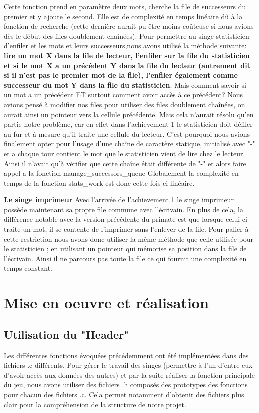 \documentclass[12pt]{article}
\begin{document}
\bigbreak
Cette fonction prend en paramètre deux mots, cherche la file de successeurs du premier et y ajoute le second. Elle est de complexité en temps linéaire dû à la fonction de recherche (cette dernière aurait pu être moins coûteuse si nous avions dès le début des files doublement chaînées). Pour permettre au singe statisticien d'enfiler et les mots et leurs successeurs,nous avons utilisé la méthode suivante: \textbf{lire un mot  X dans la file de lecteur, l'enfiler sur la file du statisticien et si le mot X a un précédent Y dans la file du lecteur (autrement dit si il n'est pas le premier mot de la file), l'enfiler également comme successeur du mot Y dans la file du statisticien}. Mais comment savoir si un mot a un précédent ET surtout comment avoir accès à ce précédent? Nous avions pensé à modifier nos files pour utiliser des files doublement chaînées, on aurait ainsi un pointeur vers la cellule précédente. Mais cela n'aurait résolu qu'en partie notre problème, car en effet dans l'achievement 1 le statisticien doit défiler au fur et à mesure qu'il traite une cellule du lecteur. C'est pourquoi nous avions finalement opter pour l'usage d'une chaîne de caractère statique, initialisé avec "-" et a chaque tour contient le mot que le statisticien vient de lire chez le lecteur. Ainsi il n'avait qu'à vérifier que cette chaîne était différente de "-" et alors faire appel a la fonction manage\_successors\_queue
Globalement la complexité en temps de la fonction stats\_work est donc cette fois ci linéaire.

\bigbreak
\textbf{Le singe imprimeur}
\bigbreak
Avec l'arrivée de l'achievement 1 le singe imprimeur possède maintenant sa propre file commune avec l'écrivain. En plus de cela, la différence notable avec la version précédente du primate est que lorsque celui-ci traite un mot, il se contente de l'imprimer sans l'enlever de la file. Pour palier à cette restriction nous avons donc utiliser la même méthode que celle utilisée pour le statisticien ; en utilisant un pointeur qui mémorise sa position dans la file de l'écrivain. Ainsi il ne parcours pas toute la file ce qui fournit une complexité en temps constant.

\section{Mise en oeuvre et réalisation}
\subsection{Utilisation du "Header"}
Les différentes fonctions évoquées précédemment ont été implémentées dans des fichiers .c différents. Pour gérer le travail des singes (permettre à l'un d'entre eux d'avoir accès aux données des autres) et par la suite réaliser la fonction principale du jeu, nous avons utiliser des fichiers .h composés des prototypes des fonctions pour chacun des fichiers .c. Cela permet notamment d'obtenir des fichiers plus clair pour la compréhension de la structure de notre projet.
\end{document}
